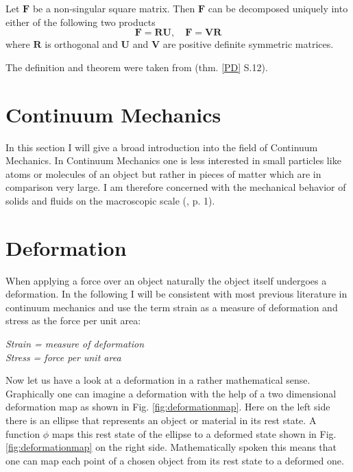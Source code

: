 \begin{theorem}
\label{PD}

Let $\mathbf{F}$ be a non-singular square matrix. Then $\mathbf{F}$ can be decomposed uniquely into either of the following two products
\[
\mathbf{F} = \mathbf{RU}, \quad \mathbf{F} = \mathbf{VR}
\]
where $\mathbf{R}$ is orthogonal and $\mathbf{U}$ and $\mathbf{V}$ are positive definite symmetric matrices.
\end{theorem}

The definition and theorem were taken from \cite{Spencer1980} (thm. \ref{PD} S.12).





\section{Continuum Mechanics}
In this section I will give a broad introduction into the field of Continuum Mechanics. In Continuum Mechanics one is less interested in small particles like atoms or molecules of an object but rather in pieces of matter which are in comparison very large. I am therefore concerned with the mechanical behavior of solids and fluids on the macroscopic scale (\cite{Spencer1980}, p. 1).


\section{Deformation}
When applying a force over an object naturally the object itself undergoes a deformation. In the following I will be consistent with most previous literature in continuum mechanics and use the term strain as a measure of deformation and stress as the force per unit area:

\begin{addmargin}[2cm]{2cm}
\textit{Strain = measure of deformation}  \\
\textit{Stress = force per unit area} 
\end{addmargin}




Now let us have a look at a deformation in a rather mathematical sense. Graphically one can imagine a deformation with the help of a two dimensional deformation map as shown in Fig. \ref{fig:deformationmap}. Here on the left side there is an ellipse that represents an object or material in its rest state. A function $\phi$ maps this rest state of the ellipse to a deformed state shown in Fig. \ref{fig:deformationmap} on the right side. Mathematically spoken this means that one can map each point of a chosen object from its rest state to a deformed one.

